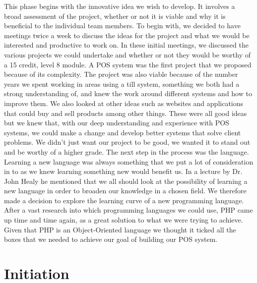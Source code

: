 This phase begins with the innovative idea we wish to develop. It involves a broad assessment of the project, whether or not it is viable and why it is beneficial to the individual team members.
To begin with, we decided to have meetings twice a week to discuss the ideas for the project and what we would be interested and productive to work on. In these initial meetings, we discussed the various projects we could undertake and whether or not they would be worthy of a 15 credit, level 8 module. 
\newline
\newline
A POS system was the first project that we proposed because of its complexity. The project was also viable because of the number years we spent working in areas using a till system, something we both had a strong understanding of, and knew the work around different systems and how to improve them. 
\newline
\newline
We also looked at other ideas such as websites and applications that could buy and sell products among other things. These were all good ideas but we knew that, with our deep understanding and experience with POS systems, we could make a change and develop better systems that solve client problems. We didn’t just want our project to be good, we wanted it to stand out and be worthy of a higher grade.
\newline
\newline
The next step in the process was the language. Learning a new language was always something that we put a lot of consideration in to as we knew learning something new would benefit us. In a lecture by Dr. John Healy he mentioned that we all should look at the possibility of learning a new language in order to broaden our knowledge in a chosen field. We therefore made a decision to explore the learning curve of a new programming language.
\newline
\newline
After a vast research into which programming languages we could use, PHP came up time and time again, as a great solution to what we were trying to achieve. Given that PHP is an Object-Oriented language we thought it ticked all the boxes that we needed to achieve our goal of building our POS system. 

\section{Initiation} 

